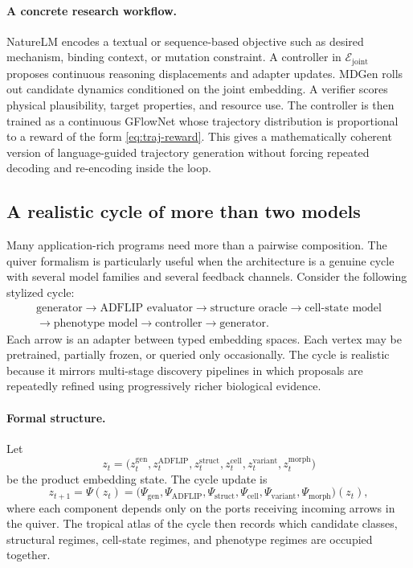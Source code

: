 \documentclass[11pt]{article}
\theoremstyle{definition}
\theoremstyle{plain}
\theoremstyle{remark}
\newcommand{\mc}[1]{\mathcal{#1}}
\newcommand{\Emb}{\mc{E}}
\begin{document}
\paragraph{A concrete research workflow.}
NatureLM encodes a textual or sequence-based objective such as desired mechanism, binding context, or mutation constraint.
A controller in $\Emb_{\mathrm{joint}}$ proposes continuous reasoning displacements and adapter updates.
MDGen rolls out candidate dynamics conditioned on the joint embedding.
A verifier scores physical plausibility, target properties, and resource use.
The controller is then trained as a continuous GFlowNet whose trajectory distribution is proportional to a reward of the form \eqref{eq:traj-reward}.
This gives a mathematically coherent version of language-guided trajectory generation without forcing repeated decoding and re-encoding inside the loop.

\subsection{A realistic cycle of more than two models}
\label{sec:realistic-cycle}

Many application-rich programs need more than a pairwise composition.
The quiver formalism is particularly useful when the architecture is a genuine cycle with several model families and several feedback channels.
Consider the following stylized cycle:
\[
\substack{\text{generator} \to \text{ADFLIP evaluator} \to \text{structure oracle} \to \text{cell-state model} \\ \to \text{phenotype model} \to \text{controller} \to \text{generator}.}
\]
Each arrow is an adapter between typed embedding spaces.
Each vertex may be pretrained, partially frozen, or queried only occasionally.
The cycle is realistic because it mirrors multi-stage discovery pipelines in which proposals are repeatedly refined using progressively richer biological evidence.

\paragraph{Formal structure.}
Let
\[
z_t=
\bigl(
z_t^{\mathrm{gen}},
z_t^{\mathrm{ADFLIP}},
z_t^{\mathrm{struct}},
z_t^{\mathrm{cell}},
z_t^{\mathrm{variant}},
z_t^{\mathrm{morph}}
\bigr)
\]
be the product embedding state.
The cycle update is
\[
z_{t+1}=
\Psi(z_t)
=
\bigl(
\Psi_{\mathrm{gen}},
\Psi_{\mathrm{ADFLIP}},
\Psi_{\mathrm{struct}},
\Psi_{\mathrm{cell}},
\Psi_{\mathrm{variant}},
\Psi_{\mathrm{morph}}
\bigr)(z_t),
\]
where each component depends only on the ports receiving incoming arrows in the quiver.
The tropical atlas of the cycle then records which candidate classes, structural regimes, cell-state regimes, and phenotype regimes are occupied together.
\end{document}
